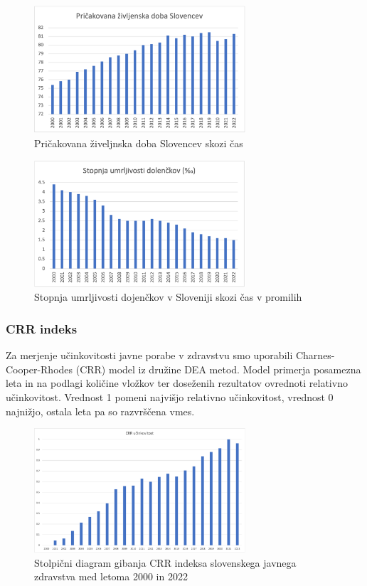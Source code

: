 \documentclass[12pt,a4paper]{article}
\theoremstyle{definition}
\begin{document}
\begin{figure}[H]
    \centering
    \includegraphics[width=0.7\textwidth]{pricak_zivlj_slo.png}
    \caption{Pričakovana živeljnska doba Slovencev skozi čas}
    \label{fig:pricak_zivlj_slo.png}
  \end{figure}

  \begin{figure}[H]
    \centering
    \includegraphics[width=0.7\textwidth]{umrljivost_doj_slo.png}
    \caption{Stopnja umrljivosti dojenčkov v Sloveniji skozi čas v promilih}
    \label{fig:umrljivost_doj_slo.png}
  \end{figure}

\subsubsection{CRR indeks}

  Za merjenje učinkovitosti javne porabe v zdravstvu smo uporabili Charnes-Cooper-Rhodes (CRR) model iz družine DEA metod. 
  Model primerja posamezna leta in na podlagi količine vložkov ter doseženih rezultatov ovrednoti relativno učinkovitost. 
  Vrednost 1 pomeni najvišjo relativno učinkovitost, vrednost 0 najnižjo, ostala leta pa so razvrščena vmes.

\begin{figure}[H]
    \centering
    \includegraphics[width=0.7\textwidth]{CRR_stolpicni_slo.png}
    \caption{Stolpični diagram gibanja CRR indeksa slovenskega javnega zdravstva med letoma 2000 in 2022}
    \label{fig:CRR_stolpicni_slo.png}
  \end{figure}
\end{document}
